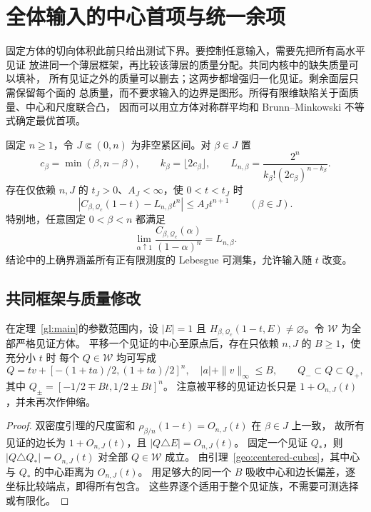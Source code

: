 \section{全体输入的中心首项与统一余项}\label{gl:section}

固定方体的切向体积此前只给出测试下界。要控制任意输入，需要先把所有高水平见证
放进同一个薄层框架，再比较该薄层的质量分配。共同内核中的缺失质量可以填补，
所有见证之外的质量可以删去；这两步都增强归一化见证。剩余面层只需保留每个面的
总质量，而不要求输入的边界是图形。所得有限维缺陷关于面质量、中心和尺度联合凸，
因而可以用立方体对称群平均和 Brunn--Minkowski 不等式确定最优首项。

\begin{theorem}[全体中心方体常数的精确首项]\label{gl:main}
固定 $n\ge1$，令 $J\Subset(0,n)$ 为非空紧区间。对 $\beta\in J$ 置
\[
 c_\beta=\min(\beta,n-\beta),\qquad k_\beta=\lfloor2c_\beta\rfloor,
 \qquad L_{n,\beta}=\frac{2^n}{k_\beta!(2c_\beta)^{n-k_\beta}}.
\]
存在仅依赖 $n,J$ 的 $t_J>0$、$A_J<\infty$，使 $0<t<t_J$ 时
\begin{equation}\label{gl:uniform-asymptotic}
 \left|C_{\beta,\mathcal Q_c}(1-t)-L_{n,\beta}t^n\right|
 \le A_Jt^{n+1}\qquad(\beta\in J).
\end{equation}
特别地，任意固定 $0<\beta<n$ 都满足
\[
 \lim_{\alpha\uparrow1}\frac{C_{\beta,\mathcal Q_c}(\alpha)}{(1-\alpha)^n}
 =L_{n,\beta}.
\]
结论中的上确界涵盖所有正有限测度的 Lebesgue 可测集，允许输入随 $t$ 改变。
\end{theorem}

\subsection{共同框架与质量修改}

\begin{lemma}[全部严格见证的共同框架]\label{gl:frame}
在定理~\ref{gl:main}的参数范围内，设 $|E|=1$ 且
$H_{\beta,\mathcal Q_c}(1-t,E)\ne\varnothing$。令 $\mathscr W$ 为全部严格见证方体。
平移一个见证的中心至原点后，存在只依赖 $n,J$ 的 $B\ge1$，使充分小 $t$ 时
每个 $Q\in\mathscr W$ 均可写成
\[
 Q=tv+[-(1+ta)/2,(1+ta)/2]^n,\quad |a|+\|v\|_\infty\le B,
 \qquad Q_-\subset Q\subset Q_+,
\]
其中
$Q_\pm=[-1/2\mp Bt,1/2\pm Bt]^n$。
注意被平移的见证边长只是 $1+O_{n,J}(t)$，并未再次作伸缩。
\end{lemma}
\begin{proof}
双密度引理的尺度窗和 $\rho_{\beta/n}(1-t)=O_{n,J}(t)$ 在 $\beta\in J$ 上一致，
故所有见证的边长为 $1+O_{n,J}(t)$，且 $|Q\triangle E|=O_{n,J}(t)$。
固定一个见证 $Q_*$，则 $|Q\triangle Q_*|=O_{n,J}(t)$ 对全部 $Q\in\mathscr W$ 成立。
由引理~\ref{geo:centered-cubes}，其中心与 $Q_*$ 的中心距离为 $O_{n,J}(t)$。
用足够大的同一个 $B$ 吸收中心和边长偏差，逐坐标比较端点，即得所有包含。
这些界逐个适用于整个见证族，不需要可测选择或有限化。
\end{proof}

